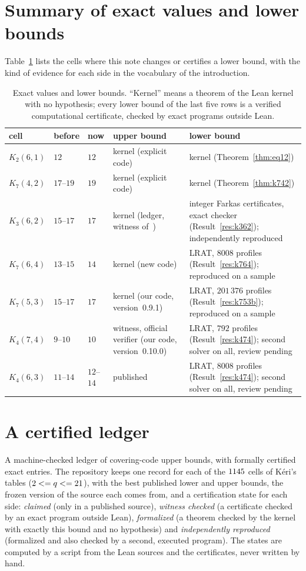 \documentclass[11pt]{amsart}
\theoremstyle{definition}
\theoremstyle{remark}
\begin{document}
\section{Summary of exact values and lower bounds}\label{sec:summary}
Table~\ref{tab:exact} lists the cells where this note changes or certifies a lower bound, with the kind of evidence for each side in the vocabulary of the introduction.

\begin{table}[ht]
\centering
\small
\begin{tabular}{@{}llllp{4.6cm}@{}}
\toprule
cell & before & now & upper bound & lower bound \\
\midrule
$K_2(6,1)$ & $12$ & $12$ & kernel (explicit code) & kernel (Theorem~\ref{thm:eq12}) \\
$K_7(4,2)$ & $17$--$19$ & $19$ & kernel (explicit code) & kernel (Theorem~\ref{thm:k742}) \\
$K_3(6,2)$ & $15$--$17$ & $17$ & kernel (ledger, witness of~\cite{hr1991}) & integer Farkas certificates, exact checker (Result~\ref{res:k362}); independently reproduced \\
$K_7(6,4)$ & $13$--$15$ & $14$ & kernel (new code)
 & LRAT, $8008$ profiles (Result~\ref{res:k764}); reproduced on a sample \\
$K_7(5,3)$ & $15$--$17$ & $17$ & kernel (our code, version~0.9.1) & LRAT, $201\,376$ profiles (Result~\ref{res:k753b}); reproduced on a sample \\
$K_4(7,4)$ & $9$--$10$ & $10$ & witness, official verifier (our code, version~0.10.0) & LRAT, $792$ profiles (Result~\ref{res:k474}); second solver on all, review pending \\
$K_4(6,3)$ & $11$--$14$ & $12$--$14$ & published & LRAT, $8008$ profiles (Result~\ref{res:k474}); second solver on all, review pending \\
\bottomrule
\end{tabular}
\caption{Exact values and lower bounds. ``Kernel'' means a theorem of the Lean kernel with no hypothesis; every lower bound of the last five rows is a verified computational certificate, checked by exact programs outside Lean.}
\label{tab:exact}
\end{table}

\section{A certified ledger}\label{sec:ledger}
A machine-checked ledger of covering-code upper bounds, with formally certified exact entries.
The repository keeps one record for each of the $1145$ cells of Kéri's tables ($2<= q<= 21$), with the best published lower and upper bounds, the frozen version of the source each comes from, and a certification state for each side: \emph{claimed} (only in a published source), \emph{witness checked} (a certificate checked by an exact program outside Lean), \emph{formalized} (a theorem checked by the kernel with exactly this bound and no hypothesis) and \emph{independently reproduced} (formalized and also checked by a second, executed program).
The states are computed by a script from the Lean sources and the certificates, never written by hand.
\end{document}
